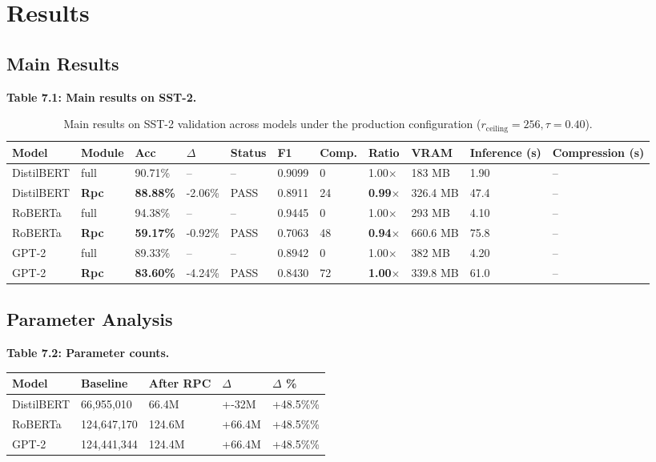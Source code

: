 
\section{Results}

\subsection{Main Results}

\textbf{Table 7.1: Main results on SST-2.}

\begin{table}[t]
\centering
\small
\begin{tabular}{lllllllllll}
\toprule
\textbf{Model} & \textbf{Module} & \textbf{Acc} & \textbf{$\Delta$} & \textbf{Status} & \textbf{F1} & \textbf{Comp.} & \textbf{Ratio} & \textbf{VRAM} & \textbf{Inference (s)} & \textbf{Compression (s)} \\
\midrule
DistilBERT & full & 90.71\% & -- & -- & 0.9099 & 0 & 1.00$\times$ & 183 MB & 1.90 & -- \\
DistilBERT & \textbf{Rpc} & \textbf{88.88\%} & -2.06\% & PASS & 0.8911 & 24 & \textbf{0.99$\times$} & 326.4 MB & 47.4 & -- \\
RoBERTa & full & 94.38\% & -- & -- & 0.9445 & 0 & 1.00$\times$ & 293 MB & 4.10 & -- \\
RoBERTa & \textbf{Rpc} & \textbf{59.17\%} & -0.92\% & PASS & 0.7063 & 48 & \textbf{0.94$\times$} & 660.6 MB & 75.8 & -- \\
GPT-2 & full & 89.33\% & -- & -- & 0.8942 & 0 & 1.00$\times$ & 382 MB & 4.20 & -- \\
GPT-2 & \textbf{Rpc} & \textbf{83.60\%} & -4.24\% & PASS & 0.8430 & 72 & \textbf{1.00$\times$} & 339.8 MB & 61.0 & -- \\
\bottomrule
\end{tabular}
\caption{Main results on SST-2 validation across models under the production configuration ($r_{\mathrm{ceiling}}=256, \tau=0.40$).}
\label{tab:main_sst2}
\end{table}

\subsection{Parameter Analysis}

\textbf{Table 7.2: Parameter counts.}

\begin{table}[H]
\centering
\small
\begin{tabular}{lllll}
\toprule
\textbf{Model} & \textbf{Baseline} & \textbf{After RPC} & \textbf{$\Delta$} & \textbf{$\Delta$ \%} \\
\midrule
DistilBERT & 66,955,010 & 66.4M & +-32M & +48.5\%\% \\
RoBERTa & 124,647,170 & 124.6M & +66.4M & +48.5\%\% \\
GPT-2 & 124,441,344 & 124.4M & +66.4M & +48.5\%\% \\
\bottomrule
\end{tabular}
\end{table}


